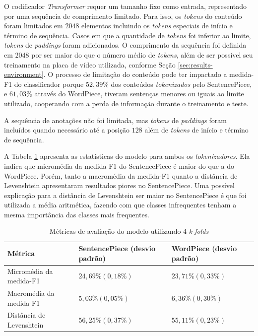 O codificador \textit{Transformer} requer um tamanho fixo como entrada, representado por uma sequência de comprimento limitado. Para isso, os \textit{tokens} do conteúdo foram limitados em $2048$ elementos incluindo os \textit{tokens} especiais de início e término de sequência. Casos em que a quantidade de \textit{tokens} foi inferior ao limite, \textit{tokens} de \textit{paddings} foram adicionados. O comprimento da sequência foi definida em $2048$ por ser maior do que o número médio de \textit{tokens}, além de ser possível seu treinamento na placa de vídeo utilizada, conforme Seção \ref{sec:results-environment}. O processo de limitação do conteúdo pode ter impactado a medida-F1 do classificador porque $52,39\%$ dos conteúdos \textit{tokenizados} pelo SentencePiece, e $61,03\%$ através do WordPiece, tiveram sentenças menores ou iguais ao limite utilizado, cooperando com a perda de informação durante o treinamento e teste.

A sequência de anotações não foi limitada, mas \textit{tokens} de \textit{paddings} foram incluídos quando necessário até a posição $128$ além de \textit{tokens} de início e término de sequência.

A Tabela \ref{table:xfmr_xfmr_statistics} apresenta as estatísticas do modelo para ambos os \textit{tokenizadores}. Ela indica que micromédia da medida-F1 do SentencePiece é maior do que a do WordPiece. Porém, tanto a macromédia da medida-F1 quanto a distância de Levenshtein apresentaram resultados piores no SentencePiece. Uma possível explicação para a distância de Levenshtein ser maior no SentencePiece é que foi utilizada a média aritmética, fazendo com que classes infrequentes tenham a mesma importância das classes mais frequentes.
\begin{table}[ht!]
    \caption{Métricas de avaliação do modelo \xfmrxfmr{} utilizando 4 \textit{k-folds}}
    \label{table:xfmr_xfmr_statistics}
    \centering
    \begin{tabular}{
        >{\centering\arraybackslash}m{} | >{\centering\arraybackslash}m{} | >{\centering\arraybackslash}m{}}
        \hline
        Métrica & SentencePiece (desvio padrão) & WordPiece (desvio padrão) \\
        \hline
        Micromédia da medida-F1 & $24,69\% (0,18\%)$ & $23,71\% (0,33\%)$ \\
        \hline
        Macromédia da medida-F1 & $5,03\% (0,05\%)$ & $6,36\% (0,30\%)$ \\
        \hline
        Distância de Levenshtein & $56,25\% (0,37\%)$ & $55,11\% (0,23\%)$ \\
        \hline
    \end{tabular}
\end{table}

